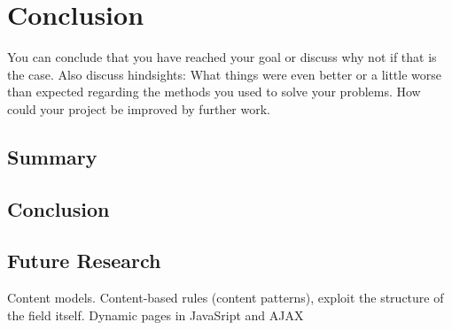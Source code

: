 \chapter{Conclusion}

You can conclude that you have reached your goal or discuss why not if that is the case. Also discuss hindsights: What things were even better or a little worse than expected regarding the methods you used to solve your problems. How could your project be improved by further work.

\section{Summary}

\section{Conclusion}

\section{Future Research} %
\label{sec:section name}

Content models.
Content-based rules (content patterns), exploit the structure of the field itself.
Dynamic pages in JavaSript and AJAX


